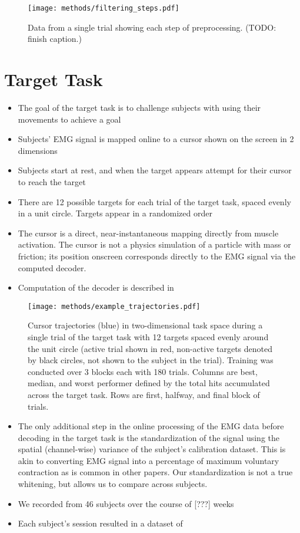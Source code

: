 \documentclass[../main.tex]{subfiles}
\begin{document}
\begin{figure}[H]%
  \centering
  \texttt{[image: methods/filtering\_steps.pdf]}
  \caption[Data filtering steps]{Data from a single trial showing each step of preprocessing. (TODO: finish caption.)}\label{fig:filtering_steps}
\end{figure}


\section{Target Task}


\begin{itemize}
  \item The goal of the target task is to challenge subjects with using their movements to achieve a goal
  \item Subjects' EMG signal is mapped online to a cursor shown on the screen in 2 dimensions
  \item Subjects start at rest, and when the target appears attempt for their cursor to reach the target
  \item There are 12 possible targets for each trial of the target task, spaced evenly in a unit circle. Targets appear in a randomized order
  \item The cursor is a direct, near-instantaneous mapping directly from muscle activation. The cursor is not a physics simulation of a particle with mass or friction; its position onscreen corresponds directly to the EMG signal via the computed decoder.
  \item Computation of the decoder is described in 
\end{itemize}


\begin{figure}[H]%
  \centering
  \texttt{[image: methods/example\_trajectories.pdf]}
  \caption{Cursor trajectories (blue) in two-dimensional task space during a single trial of the target task with 12 targets spaced evenly around the unit circle (active trial shown in red, non-active targets denoted by black circles, not shown to the subject in the trial). Training was conducted over 3 blocks each with 180 trials. Columns are best, median, and worst performer defined by the total hits accumulated across the target task. Rows are first, halfway, and final block of trials.}\label{fig:example_trajectories}
\end{figure}

\begin{itemize}
  \item The only additional step in the online processing of the EMG data before decoding in the target task is the standardization of the signal using the spatial (channel-wise) variance of the subject's calibration dataset. This is akin to converting EMG signal into a percentage of maximum voluntary contraction as is common in other papers. Our standardization is not a true whitening, but allows us to compare across subjects.
  \item We recorded from 46 subjects over the course of [???] weeks 
  \item Each subject's session resulted in a dataset of 
\end{itemize}
\end{document}
